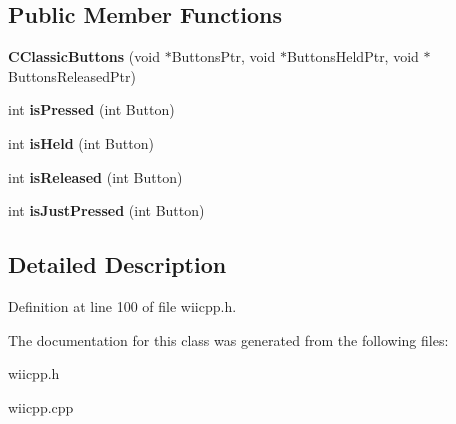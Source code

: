 \subsection*{\-Public \-Member \-Functions}
\begin{DoxyCompactItemize}
\item 
\hypertarget{class_c_classic_buttons_ae98fc8217e2e7a38e9393be008534268}{{\bfseries \-C\-Classic\-Buttons} (void $\ast$\-Buttons\-Ptr, void $\ast$\-Buttons\-Held\-Ptr, void $\ast$\-Buttons\-Released\-Ptr)}\label{class_c_classic_buttons_ae98fc8217e2e7a38e9393be008534268}

\item 
\hypertarget{class_c_button_base_a0d4758b9e756a8c3c2bb39b907ea9170}{int {\bfseries is\-Pressed} (int \-Button)}\label{class_c_button_base_a0d4758b9e756a8c3c2bb39b907ea9170}

\item 
\hypertarget{class_c_button_base_a67e38daead9d22e33f6a3d85902d1f98}{int {\bfseries is\-Held} (int \-Button)}\label{class_c_button_base_a67e38daead9d22e33f6a3d85902d1f98}

\item 
\hypertarget{class_c_button_base_a575dee487bcca1abf29c1084dfdd5bb8}{int {\bfseries is\-Released} (int \-Button)}\label{class_c_button_base_a575dee487bcca1abf29c1084dfdd5bb8}

\item 
\hypertarget{class_c_button_base_ab74fd21217c5e379a613b7474af4f9b8}{int {\bfseries is\-Just\-Pressed} (int \-Button)}\label{class_c_button_base_ab74fd21217c5e379a613b7474af4f9b8}

\end{DoxyCompactItemize}


\subsection{\-Detailed \-Description}


\-Definition at line 100 of file wiicpp.\-h.



\-The documentation for this class was generated from the following files\-:\begin{DoxyCompactItemize}
\item 
wiicpp.\-h\item 
wiicpp.\-cpp\end{DoxyCompactItemize}
